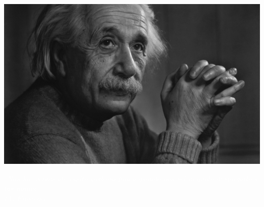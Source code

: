 \documentclass[10pt, aspectratio=169]{beamer}
\begin{document}
{
    \includegraphics[width=\paperwidth,height=\paperheight]{ae.jpeg}
}
{
\begin{frame}[standout]
    \LARGE {\textit{ \textcolor{white}{“Non hai veramente capito qualcosa fino a quando non sei in grado di spiegarlo a tua nonna”\\[20 pt]
    (A. Einstein)}}}

\end{frame}
}
\end{document}
